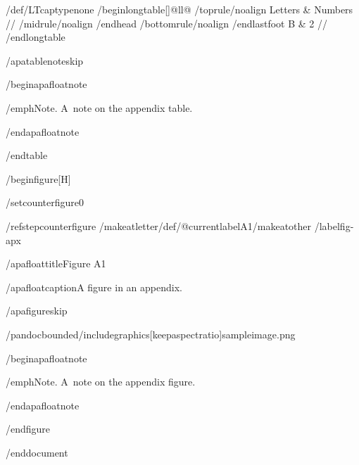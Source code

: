 {/def/LTcaptype{none} %
/begin{longtable}[]{@{}ll@{}}
/toprule/noalign{}
Letters & Numbers //
/midrule/noalign{}
/endhead
/bottomrule/noalign{}
/endlastfoot
B & 2 //
/end{longtable}
}

/apatablenoteskip

/begin{apafloatnote}

/emph{Note}. A~note on the appendix table.

/end{apafloatnote}

/end{table}

/begin{figure}[H]

/setcounter{figure}{0}

/refstepcounter{figure}%
/makeatletter/def/@currentlabel{A1}/makeatother%
/label{fig-apx}

/apafloattitle{Figure A1}

/apafloatcaption{A figure in an appendix.}

/apafigureskip

/pandocbounded{/includegraphics[keepaspectratio]{sampleimage.png}}

/begin{apafloatnote}

/emph{Note}. A~note on the appendix figure.

/end{apafloatnote}

/end{figure}




/end{document}
